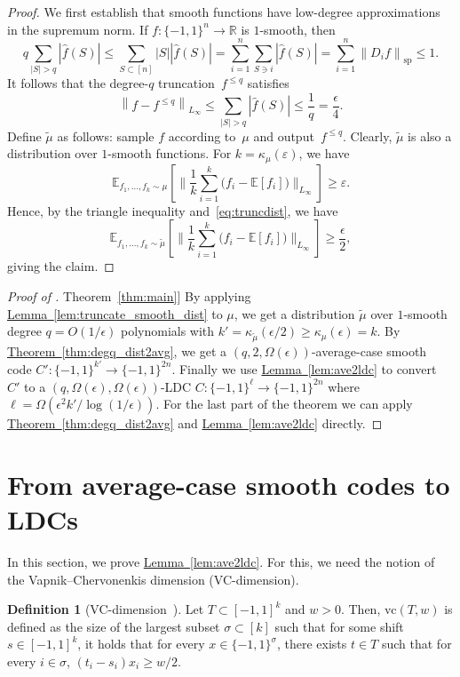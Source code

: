 \documentclass[11pt]{article}
\numberwithin{equation}{section}
\theoremstyle{definition}
\newtheorem{definition}[theorem]{Definition}
\theoremstyle{plain}
\newcommand{\R}{\mathbb R}
\newcommand{\expref}[2]{\hyperref[#2]{#1~\ref{#2}}}
\newcommand{\sBC}{{\{-1,1\}}}
\newcommand{\Exp}{{\mathbb{E}}}
\newcommand{\specnorm}[1]{\left\lVert #1 \right\rVert_{\mathrm{sp}}}
\newcommand{\norm}[1]{\left\lVert #1\right\rVert}
\newcommand{\eps}{\varepsilon}
\newcommand{\vc}{{\mathrm{vc}}}
\newcommand{\beq}{\begin{equation}}
\newcommand{\eeq}{\end{equation}}
\newcommand{\beqn}{\begin{equation*}}
\newcommand{\eeqn}{\end{equation*}}
\begin{document}
\begin{proof}
We first establish that smooth functions have low-degree approximations in the supremum norm.
If $f:\sBC^n\to \R$ is $1$-smooth, then
\beqn
q\sum_{|S|>q}|\widehat{f}(S)|\le \sum_{S\subset [n]}|S||\widehat{f}(S)|=\sum_{i=1}^n\sum_{S\ni i} |\widehat{f}(S)| = \sum_{i=1}^n \specnorm{D_if}\le 1.
\eeqn
It follows that the degree-$q$ truncation~$f^{\leq q}$ satisfies
\beq\label{eq:truncdist}
\norm{f-f^{\le q}}_{L_\infty}\le \sum_{|S|>q} |\widehat{f}(S)|\le \frac{1}{q}=\frac{\epsilon}{4}.
\eeq
Define $\tilde{\mu}$ as follows: sample $f$ according to~$\mu$ and output~$f^{\le q}$. Clearly, $\tilde{\mu}$ is also a distribution over $1$-smooth functions. For $k=\kappa_\mu(\eps)$, we have 
\beqn
\Exp_{f_1,\dots,f_k \sim \mu}\left[\Big\|\frac{1}{k}\sum_{i=1}^k \big(f_i - \Exp[f_i]\big)\Big\|_{L_\infty}\right] \geq \eps.\eeqn
Hence, by the triangle inequality and~\eqref{eq:truncdist}, we have
\beqn
\Exp_{f_1,\dots,f_k \sim \tilde{\mu}}\left[\Big\|\frac{1}{k}\sum_{i=1}^k \big(f_i - \Exp[f_i]\big)\Big\|_{L_\infty}\right] \geq \frac{\epsilon}{2},
\eeqn
giving the claim.
\end{proof}

\begin{proof}[Proof of \expref{Theorem}{thm:main}]
By applying \expref{Lemma}{lem:truncate_smooth_dist} to $\mu$, we get a distribution $\tilde{\mu}$ over $1$-smooth degree $q=O(1/\epsilon)$ polynomials with $k'=\kappa_{\tilde{\mu}}(\epsilon/2)\ge \kappa_{\mu}(\epsilon)=k$. By \expref{Theorem}{thm:degq_dist2avg}, we get a $(q,2,\Omega(\epsilon))$-average-case smooth code $C':\sBC^{k'}\to \sBC^{2n}$. Finally we use \expref{Lemma}{lem:ave2ldc} to convert~$C'$ to a $(q,\Omega(\epsilon),\Omega(\epsilon))$-LDC $C:\sBC^\ell \to \sBC^{2n}$ where $\ell=\Omega(\epsilon^2k'/\log(1/\epsilon))$. 
For the last part of the theorem we can  apply \expref{Theorem}{thm:degq_dist2avg} and \expref{Lemma}{lem:ave2ldc} directly.
\end{proof}


%
\section{From average-case smooth codes to LDCs}
\label{sec:avg2ldc}
In this section, we prove \expref{Lemma}{lem:ave2ldc}. For this, we need the notion of the Vapnik--Chervonenkis dimension (VC-dimension).

\begin{definition}[VC-dimension~\cite{Mendelson:2003}]\label{def:vcdim}
Let $T\subset [-1,1]^k$ and $w>0$.
Then, $\vc(T,w)$ is defined as the size of the largest subset $\sigma\subset [k]$ such that for some shift $s\in [-1,1]^k$, it holds that for every $x\in \sBC^\sigma$, there exists $t\in T$ such that for every $i\in \sigma$, $(t_i-s_i)x_i\ge w/2$.
\end{definition}
\end{document}
